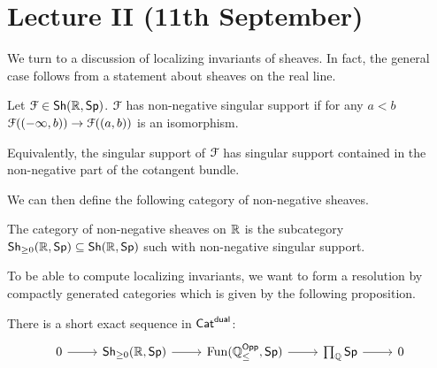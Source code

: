 \section{Lecture II (11th September)}\label{sec: Efimov II}
We turn to a discussion of localizing invariants of sheaves. In fact, the general case follows from a statement about sheaves on the real line. 
\begin{definition}\label{def: sheaves with non-negative singular support}
     Let $\EuScript{F}\in\mathsf{Sh}(\mathbb{R},\mathsf{Sp})$. $\EuScript{F}$ has non-negative singular support if for any $a<b$ $\EuScript{F}((-\infty,b))\to\EuScript{F}((a,b))$ is an isomorphism. 
\end{definition}
\begin{remark}
    Equivalently, the singular support of $\EuScript{F}$ has singular support contained in the non-negative part of the cotangent bundle. 
\end{remark} 
We can then define the following category of non-negative sheaves. 
\begin{definition}\label{def: non-negative sheaves}
    The category of non-negative sheaves on $\mathbb{R}$ is the subcategory $\mathsf{Sh}_{\geq0}(\mathbb{R},\mathsf{Sp})\subseteq\mathsf{Sh}(\mathbb{R},\mathsf{Sp})$ such with non-negative singular support. 
\end{definition}
To be able to compute localizing invariants, we want to form a resolution by compactly generated categories which is given by the following proposition. 
\begin{proposition}\label{prop: SES for non-negative sheaves}
    There is a short exact sequence in $\mathsf{Cat}^{\mathsf{dual}}$:
    \begin{equation}\label{eqn: SES for non-negative sheaves}
    \begin{tikzcd}
        0 & {\Sh_{\geq0}(\RR,\Sp)} & {\Fun(\QQ_{\leq}^{\Opp},\Sp)} & {\prod_{\QQ}\Sp} & 0
        \arrow[from=1-1, to=1-2]
        \arrow[from=1-2, to=1-3]
        \arrow[from=1-3, to=1-4]
        \arrow[from=1-4, to=1-5]
    \end{tikzcd}
    \end{equation}
\end{proposition}
